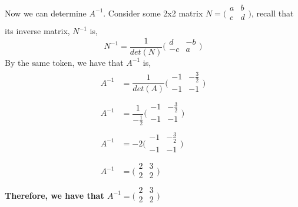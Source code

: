\documentclass[12pt]{book}
\begin{document}
\begin{enumerate}
Now we can determine $A^{-1}$. Consider some 2x2 matrix $N = \bigg(\begin{smallmatrix} a & b \\ c & d \\ \end{smallmatrix}\bigg)$, recall that its inverse matrix, $N^{-1}$ is,
$$N^{-1} = \dfrac{1}{det(N)} \bigg(\begin{smallmatrix} d & -b \\ -c & a \\ \end{smallmatrix}\bigg)$$
By the same token, we have that $A^{-1}$ is,
\begingroup
\addtolength{\jot}{0.5em}
\begin{align}
    A^{-1} &= \dfrac{1}{det(A)} \bigg(\begin{smallmatrix} -1 & -\frac{3}{2} \\ -1 & -1 \\ \end{smallmatrix}\bigg) \\
    A^{-1} &= \dfrac{1}{-\frac{1}{2}} \bigg(\begin{smallmatrix} -1 & -\frac{3}{2} \\ -1 & -1 \\ \end{smallmatrix}\bigg) \\
    A^{-1} &= -2 \bigg(\begin{smallmatrix} -1 & -\frac{3}{2} \\ -1 & -1 \\ \end{smallmatrix}\bigg) \\
    A^{-1} &= \bigg(\begin{smallmatrix} 2 & 3 \\ 2 & 2 \\ \end{smallmatrix}\bigg)
\end{align}
\endgroup
\textbf{Therefore, we have that $A^{-1} = \bigg(\begin{smallmatrix} 2 & 3 \\ 2 & 2 \\ \end{smallmatrix}\bigg)$}\\


\end{enumerate}
\end{document}
